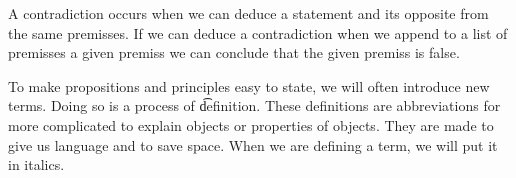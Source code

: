 A contradiction occurs when we can deduce a statement and its opposite from the same premisses.
If we can deduce a contradiction when we append to a list of premisses a given premiss we can conclude that the given premiss is false.


To make propositions and principles easy to state, we will often introduce new terms.
Doing so is a process of \t{definition}.
These definitions are abbreviations for more complicated to explain objects or properties of objects.
They are made to give us language and to save space.
When we are defining a term, we will put it in italics.


